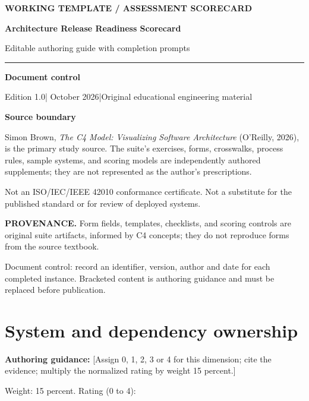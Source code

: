 \documentclass[10pt,letterpaper]{article}
\newcommand{\Prompter}[1]{\par{\small\color{C4Teal}\textbf{Authoring guidance:} #1}\par}
\newcommand{\SourceNote}[1]{\par\smallskip\noindent\colorbox{C4Light}{\parbox{0.94\linewidth}{\footnotesize\textbf{PROVENANCE.} #1}}\par\medskip}
\newcommand{\DocStart}[3]{%
\begin{document}
\begin{titlepage}
\renewcommand{\thepage}{title-\arabic{page}}
\vspace*{0.55in}
{\sffamily\bfseries\small\color{C4Teal}#1}\par\vspace{0.24in}
{\sffamily\bfseries\fontsize{26}{31}\selectfont\color{C4Navy}#2}\par\vspace{0.18in}
{\large\color{C4Gray}#3}\par\vspace{0.4in}
\textcolor{C4Teal}{\rule{\linewidth}{1.15pt}}\par\vspace{0.24in}
\textbf{Document control}\par
Edition 1.0\quad|\quad 30 October 2026\quad|\quad Original educational engineering material\par
\vspace{0.17in}
\textbf{Source boundary}\par
Simon Brown, \emph{The C4 Model: Visualizing Software Architecture} (O'Reilly, 2026), is the primary study source. The suite's exercises, forms, crosswalks, process rules, sample systems, and scoring models are independently authored supplements; they are not represented as the author's prescriptions.\par
\vfill
{\small\color{C4Gray}Not an ISO/IEC/IEEE 42010 conformance certificate. Not a substitute for the published standard or for review of deployed systems.}\par
\end{titlepage}
}
\DocStart{WORKING TEMPLATE / ASSESSMENT SCORECARD}{Architecture Release Readiness Scorecard}{Editable authoring guide with completion prompts}
\SourceNote{Form fields, templates, checklists, and scoring controls are original suite artifacts, informed by C4 concepts; they do not reproduce forms from the source textbook.}
Document control: record an identifier, version, author and date for each completed instance. Bracketed content is authoring guidance and must be replaced before publication.

\section{System and dependency ownership}

\Prompter{[Assign 0, 1, 2, 3 or 4 for this dimension; cite the evidence; multiply the normalized rating by weight 15 percent.] }
Weight: 15 percent. Rating (0 to 4):
\end{document}
